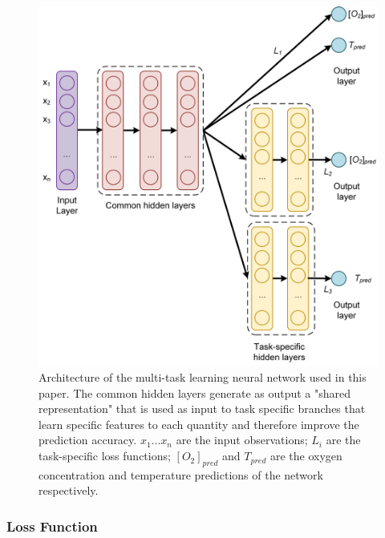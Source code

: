 \documentclass[9pt,twocolumn,twoside,pdftex]{optica}
\begin{document}
\begin{figure}[t!]
\centering
\includegraphics[width=8.7 cm]{NN_MTL_O2_T.png}
\caption{Architecture of the multi-task learning neural network used in this paper. The common hidden layers generate as output a "shared representation" that is used as input to task specific branches that learn specific features to each quantity and therefore improve the prediction accuracy. $x_1 ... x_n$ are the input observations; $L_i$ are the task-specific loss functions; $[O_2]_{pred}$ and $T_{pred}$ are the oxygen concentration and temperature predictions of the network respectively.} 
\label{fig:NN_MTL_O2_T}
\end{figure}


\subsubsection{Loss Function}
\end{document}

